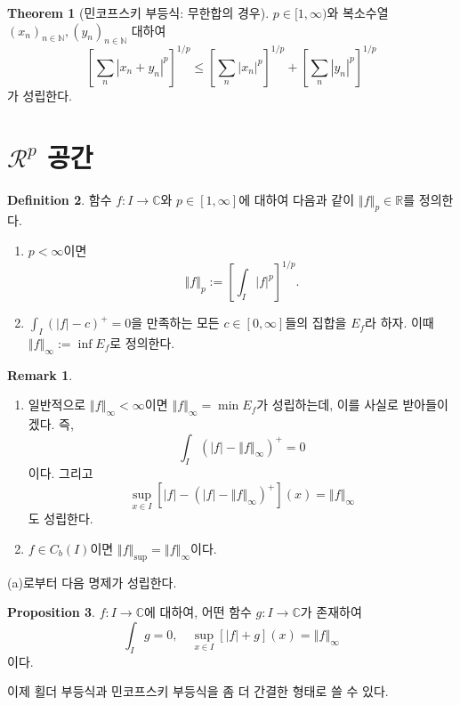 \documentclass[11pt]{book}
\numberwithin{equation}{chapter}
\def\NN{\mathbb{N}}
\def\RR{\mathbb{R}}
\def\CC{\mathbb{C}}
\newcommand{\abs}[1]{\left\vert#1\right\vert}
\newcommand{\norm}[1]{\left\Vert#1\right\Vert}
\newcommand{\sqbracket}[1]{\left[#1\right]}
\theoremstyle{definition}
\newtheorem{thm}{Theorem}[section]
\newtheorem{prop}[thm]{Proposition}
\newtheorem{defn}[thm]{Definition}
\newtheorem*{rem}{Remark}
\newenvironment{enum}
	{\begin{enumerate}[label=(\alph*), leftmargin=2\parindent]}
	{\end{enumerate}}
\begin{document}
\begin{thm}[민코프스키 부등식: 무한합의 경우]
    \(p \in [1, \infty)\)와 복소수열 \((x_n)_{n \in \NN}, (y_n)_{n \in \NN}\) 대하여
    \[
        \sqbracket{\sum_n \abs{x_n + y_n}^p}^{1/p} \le \sqbracket{\sum_n \abs{x_n}^p}^{1/p} + \sqbracket{\sum_n \abs{y_n}^p}^{1/p}    
    \]
    가 성립한다.
\end{thm}

\section{\(\mathcal{R}^p\) 공간}

\begin{defn}
    함수 \(f : I \to \CC\)와 \(p \in [1, \infty]\)에 대하여 다음과 같이 \(\norm{f}_p \in \RR\)를 정의한다.
    \begin{enum}
        \item \(p < \infty\)이면
        \[
            \norm{f}_p := \sqbracket{\int_I \abs{f}^p}^{1/p}.
        \]
        \item \(\int_I (\abs{f} - c)^+ = 0\)을 만족하는 모든 \(c \in [0, \infty]\)들의 집합을 \(E_f\)라 하자. 이때 \(\norm{f}_{\infty} := \inf E_f\)로 정의한다.
    \end{enum}
\end{defn}
\begin{rem}
    \quad

    \begin{enum}
        \item 일반적으로 \(\norm{f}_{\infty} < \infty\)이면 \(\norm{f}_{\infty} = \min E_f\)가 성립하는데, 이를 사실로 받아들이겠다. 즉,
        \[
        \int_I (\abs{f} - \norm{f}_{\infty})^+ = 0    
        \]
        이다. 그리고
        \[
        \sup_{x \in I} [\abs{f} - (\abs{f} - \norm{f}_{\infty})^+](x) = \norm{f}_{\infty}
        \]
        도 성립한다.
        \item \(f \in C_b(I)\)이면 \(\norm{f}_{\sup} = \norm{f}_{\infty}\)이다.
    \end{enum}
\end{rem}

(a)로부터 다음 명제가 성립한다.

\begin{prop} \label{13.3.2}
    \(f : I \to \CC\)에 대하여, 어떤 함수 \(g : I \to \CC\)가 존재하여
    \[
    \int_I g = 0, \quad \sup_{x \in I} [\abs{f} + g](x) = \norm{f}_{\infty}    
    \]
    이다.
\end{prop}

이제 횔더 부등식과 민코프스키 부등식을 좀 더 간결한 형태로 쓸 수 있다.
\end{document}
